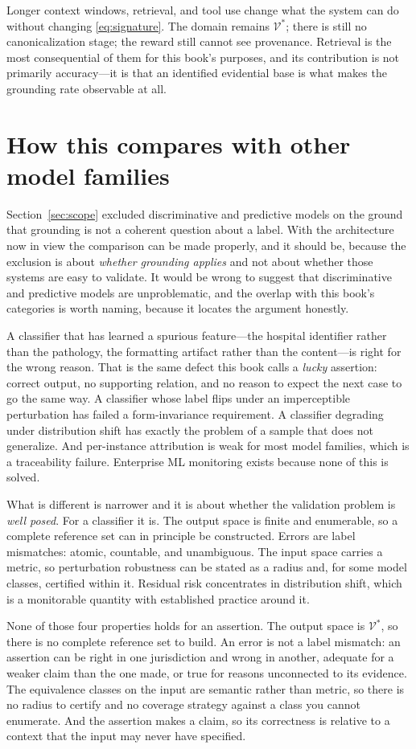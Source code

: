 Longer context windows, retrieval, and tool use change what the system can do without
changing \eqref{eq:signature}. The domain
remains $\mathcal{V}^{*}$; there is still no canonicalization stage; the reward
still cannot see provenance. Retrieval is the most consequential of them for this
book's purposes, and its contribution is not primarily accuracy---it is that an
identified evidential base is what makes the grounding rate observable at all.

\section{How this compares with other model families}
\label{sec:not-easier}

Section~\ref{sec:scope} excluded discriminative and predictive models on the ground
that grounding is not a coherent question about a label. With the architecture now in
view the comparison can be made properly, and it should be, because the exclusion is
about \emph{whether grounding applies} and not about whether those systems are easy to
validate. It would be wrong to suggest that discriminative
and predictive models are unproblematic, and the overlap with this book's categories
is worth naming, because it locates the argument honestly.

A classifier that has learned a spurious feature---the hospital identifier rather
than the pathology, the formatting artifact rather than the content---is right for
the wrong reason. That is the same defect this book calls a \emph{lucky} assertion:
correct output, no supporting relation, and no reason to expect the next case to go
the same way. A classifier whose label flips under an imperceptible perturbation has
failed a form-invariance requirement. A classifier degrading under distribution
shift has exactly the problem of a sample that does not generalize. And per-instance
attribution is weak for most model families, which is a traceability failure.
Enterprise ML monitoring exists because none of this is solved.

What is different is narrower and it is about whether the validation problem is
\emph{well posed}. For a classifier it is. The output space is finite and
enumerable, so a complete reference set can in principle be constructed. Errors are
label mismatches: atomic, countable, and unambiguous. The input space carries a
metric, so perturbation robustness can be stated as a radius and, for some model
classes, certified within it. Residual risk concentrates in distribution shift,
which is a monitorable quantity with established practice around it.

None of those four properties holds for an assertion. The output space is
$\mathcal{V}^{*}$, so there is no complete reference set to build. An error is not a
label mismatch: an assertion can be right in one jurisdiction and wrong in another,
adequate for a weaker claim than the one made, or true for reasons unconnected to
its evidence. The equivalence classes on the input are semantic rather than metric,
so there is no radius to certify and no coverage strategy against a class you cannot
enumerate. And the assertion makes a claim, so its correctness is relative to a
context that the input may never have specified.

